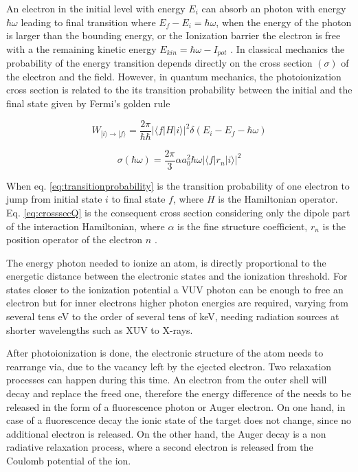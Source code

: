 An electron in the initial level with energy $E_{i}$ can absorb an photon with energy $\hbar \omega$ leading to final transition where $E_{f}-E_{i}=\hbar \omega$, when the energy of the photon is larger than the bounding energy, or the Ionization barrier the electron is free with a the remaining kinetic energy $E_{kin} = \hbar \omega - I_{pot}$ \cite{becker_vuv_1996}.
In classical mechanics the probability of the energy transition depends directly on the cross section $(\sigma)$ of the electron and the field. However,  in  quantum  mechanics,  the photoionization cross section is related to the its transition probability between the initial and the final state given by Fermi’s golden rule

 \begin{equation} 
 \label{eq:transitionprobability}
W_{|i\rangle \rightarrow |f\rangle} = \frac{2\pi}{\hbar\hbar} |\langle f|H|i\rangle|^{2} \delta(E_{i} - E_{f}-\hbar\omega)
 \end{equation}
 
 \begin{equation}
 \label{eq:crosssecQ}
 \sigma(\hbar \omega) = \frac{2\pi}{3} \alpha a_{0}^{2} \hbar \omega |\langle f|r_{n}|i\rangle|^{2}
 \end{equation}
 
When eq. \ref{eq:transitionprobability} is the transition probability of one electron to jump from initial state $i$ to final state $f$, where $H$ is the Hamiltonian operator. Eq. \ref{eq:crosssecQ} is the consequent cross section considering only the dipole part of the interaction Hamiltonian, where $\alpha$ is the fine structure coefficient, $r_{n}$ is the position operator of the electron $n$ \cite{fermi_quantum_1932}.

The energy photon needed to ionize an atom, is directly proportional to the energetic distance between the electronic states and the ionization threshold. For  states closer to the ionization potential a  VUV photon can be enough to free an electron but for inner electrons  higher photon energies are required, varying from several tens eV to the order of several tens of keV, needing radiation sources at shorter wavelengths such as XUV to X-rays.\cite{becker_vuv_1996}

After photoionization is done, the electronic structure of the atom needs to rearrange via, due to the vacancy left by the ejected electron. Two relaxation processes can happen during this time. An electron from the outer shell will decay and replace the freed one, therefore the energy difference of the needs to be released in the form of a fluorescence photon or Auger electron. On one hand, in case of a fluorescence decay the ionic state of the target does not change, since no additional electron is released. On the other hand, the Auger decay is a non radiative relaxation process, where a second electron is released from the Coulomb potential of the ion.

